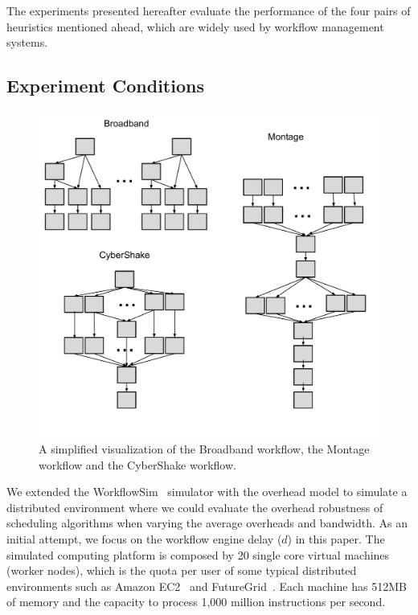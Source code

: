 \documentclass[final]{IEEEtran}
\begin{document}
The experiments presented hereafter evaluate the performance of the four pairs of heuristics mentioned ahead, which are widely used by workflow management systems. 

\subsection{Experiment Conditions}


\begin{figure}[htb]
	\centering
	\includegraphics[width=1.0\linewidth]{figure/shape.pdf} 
	\caption{A simplified visualization of the Broadband workflow, the Montage workflow and the CyberShake workflow.}
	\label{fig:shape}
	\vspace{-10pt}
\end{figure}

We extended the WorkflowSim~\cite{WorkflowSim} simulator with the overhead model to simulate a distributed environment where we could evaluate the overhead robustness of scheduling algorithms when varying the average overheads and bandwidth. As an initial attempt, we focus on the workflow engine delay ($d$) in this paper. The simulated computing platform is composed by 20 single core virtual machines (worker nodes), which is the quota per user of some typical distributed environments such as Amazon EC2~\cite{AmazonAWS} and FutureGrid~\cite{FutureGrid}. Each machine has 512MB of memory and the capacity to process 1,000 million instructions per second. 
\end{document}
